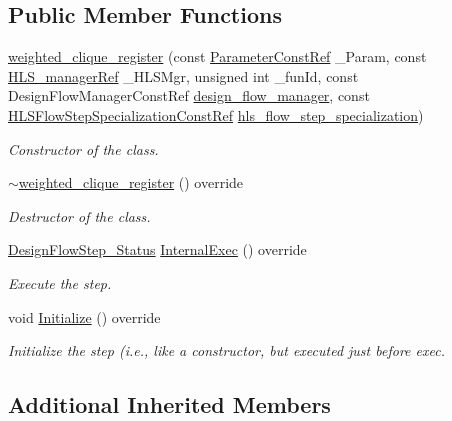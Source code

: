 \subsection*{Public Member Functions}
\begin{DoxyCompactItemize}
\item 
\hyperlink{classweighted__clique__register_a19fe57763a2e1ea8ca41c3cf53251e06}{weighted\+\_\+clique\+\_\+register} (const \hyperlink{Parameter_8hpp_a37841774a6fcb479b597fdf8955eb4ea}{Parameter\+Const\+Ref} \+\_\+\+Param, const \hyperlink{hls__manager_8hpp_acd3842b8589fe52c08fc0b2fcc813bfe}{H\+L\+S\+\_\+manager\+Ref} \+\_\+\+H\+L\+S\+Mgr, unsigned int \+\_\+fun\+Id, const Design\+Flow\+Manager\+Const\+Ref \hyperlink{classDesignFlowStep_ab770677ddf087613add30024e16a5554}{design\+\_\+flow\+\_\+manager}, const \hyperlink{hls__step_8hpp_a5fdd2edf290c196531d21d68e13f0e74}{H\+L\+S\+Flow\+Step\+Specialization\+Const\+Ref} \hyperlink{classHLS__step_a843be75ba53b81876aa3c8b870ae8a55}{hls\+\_\+flow\+\_\+step\+\_\+specialization})
\begin{DoxyCompactList}\small\item\em Constructor of the class. \end{DoxyCompactList}\item 
\hyperlink{classweighted__clique__register_a9fa17863c3a85d94e5c04f18f2f71ec6}{$\sim$weighted\+\_\+clique\+\_\+register} () override
\begin{DoxyCompactList}\small\item\em Destructor of the class. \end{DoxyCompactList}\item 
\hyperlink{design__flow__step_8hpp_afb1f0d73069c26076b8d31dbc8ebecdf}{Design\+Flow\+Step\+\_\+\+Status} \hyperlink{classweighted__clique__register_a9c11748ba96df1f9d36792ec41f1f377}{Internal\+Exec} () override
\begin{DoxyCompactList}\small\item\em Execute the step. \end{DoxyCompactList}\item 
void \hyperlink{classweighted__clique__register_a1f6d70de6fafd41bf34a6b9360a57c2b}{Initialize} () override
\begin{DoxyCompactList}\small\item\em Initialize the step (i.\+e., like a constructor, but executed just before exec. \end{DoxyCompactList}\end{DoxyCompactItemize}
\subsection*{Additional Inherited Members}


